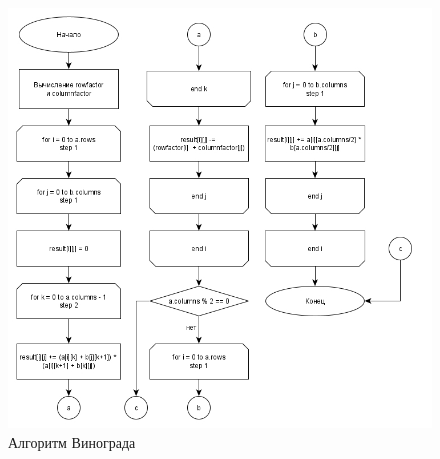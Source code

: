 \documentclass[a4paper, 14pt]{article}
\begin{document}
	\vspace{1cm}
	
	\begin{figure}[H]
		\centering
		\includegraphics[scale=0.5]{Схемы/vinograd}
		\caption{Алгоритм Винограда}
		\label{fig:vinograd}
	\end{figure}
	
\end{document}
